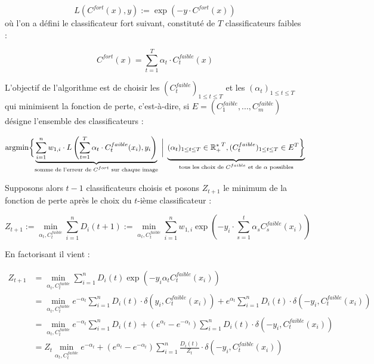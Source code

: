 \documentclass[12pt,a4paper]{article}
\DeclareMathOperator*{\argmin}{argmin}
\begin{document}
\begin{equation}
    L(C^{fort}(x), y) := \exp(-y \cdot C^{fort}(x))
\end{equation}
où l'on a défini le classificateur fort suivant, constituté de $T$ classificateurs faibles :

\[
    C^{fort}(x) = \sum_{t=1}^T \alpha_t \cdot C_t^{faible}(x)
\]

L'objectif de l'algorithme est de choisir les $(C_t^{faible})_{1 \leq t \leq T}$ et les $(\alpha_t)_{1 \leq t \leq T}$ qui minimisent la fonction de perte, c'est-à-dire, si $E = (C_1^{faible}, ..., C_m^{faible})$ désigne l'ensemble des classificateurs :

\[
    \argmin \biggl\{ 
    \underbrace{
        \sum_{i=1}^n w_{1, i} \cdot L\left(\sum_{t=1}^T \alpha_t \cdot C_t^{faible}(x_i), y_i\right) 
    }_{
        \textnormal{somme de l'erreur de $C^{fort}$ sur chaque image}
    }
    \; \bigg| \; 
    \underbrace{
        {(\alpha_t)_{1 \leq t \leq T} \in \mathbb{R_+^*}^T,(C_t^{faible})_{1 \leq t \leq T} \in E^T} 
    \biggr\}
    }_{
        \textnormal{tous les choix de $C^{faible}$ et de $\alpha$ possibles}
    }
\]

Supposons alors $t-1$ classificateurs choisis et posons $Z_{t+1}$ le minimum de la fonction de perte après le choix du $t$-ième classificateur :

\begin{equation}
    Z_{t+1} 
    := \min_{\alpha_t, C_t^{faible}} \sum_{i=1}^n D_i(t+1) 
    := \min_{\alpha_t, C_t^{faible}} \sum_{i=1}^n w_{1, i} \exp\left(-y_i \cdot \sum_{s=1}^t \alpha_s C_s^{faible}(x_i)\right)
\end{equation}

En factorisant il vient :

\begin{equation*}
\begin{split}
    Z_{t+1}  & = \min_{\alpha_t, C_t^{faible}} \sum_{i=1}^n D_i(t) \exp\left(-y_i \alpha_t C_t^{faible}(x_i)\right) \\
    & = \min_{\alpha_t, C_t^{faible}} e^{-\alpha_t} \sum_{i=1}^n D_i(t) \cdot \delta(y_i, C_t^{faible}(x_i)) + e^{\alpha_t} \sum_{i=1}^n D_i(t) \cdot \delta(-y_i, C_t^{faible}(x_i)) \\
    & = \min_{\alpha_t, C_t^{faible}} e^{-\alpha_t} \sum_{i=1}^n D_i(t)  + (e^{\alpha_t} - e^{-\alpha_t}) \sum_{i=1}^n D_i(t) \cdot \delta(-y_i, C_t^{faible}(x_i)) \\
    & = Z_t \min_{\alpha_t, C_t^{faible}} e^{-\alpha_t}  + (e^{\alpha_t} - e^{-\alpha_t}) \sum_{i=1}^n \frac{D_i(t)}{Z_t} \cdot \delta(-y_i, C_t^{faible}(x_i))
\end{split}
\end{equation*}
\end{document}
